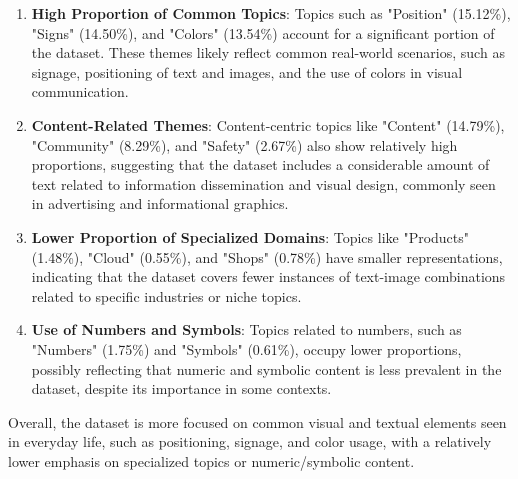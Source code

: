 \begin{enumerate}
    \item \textbf{High Proportion of Common Topics}: Topics such as "Position" (15.12\%), "Signs" (14.50\%), and "Colors" (13.54\%) account for a significant portion of the dataset. These themes likely reflect common real-world scenarios, such as signage, positioning of text and images, and the use of colors in visual communication.
    
    \item \textbf{Content-Related Themes}: Content-centric topics like "Content" (14.79\%), "Community" (8.29\%), and "Safety" (2.67\%) also show relatively high proportions, suggesting that the dataset includes a considerable amount of text related to information dissemination and visual design, commonly seen in advertising and informational graphics.
    
    \item \textbf{Lower Proportion of Specialized Domains}: Topics like "Products" (1.48\%), "Cloud" (0.55\%), and "Shops" (0.78\%) have smaller representations, indicating that the dataset covers fewer instances of text-image combinations related to specific industries or niche topics.
    
    \item \textbf{Use of Numbers and Symbols}: Topics related to numbers, such as "Numbers" (1.75\%) and "Symbols" (0.61\%), occupy lower proportions, possibly reflecting that numeric and symbolic content is less prevalent in the dataset, despite its importance in some contexts.
\end{enumerate}

Overall, the dataset is more focused on common visual and textual elements seen in everyday life, such as positioning, signage, and color usage, with a relatively lower emphasis on specialized topics or numeric/symbolic content.






